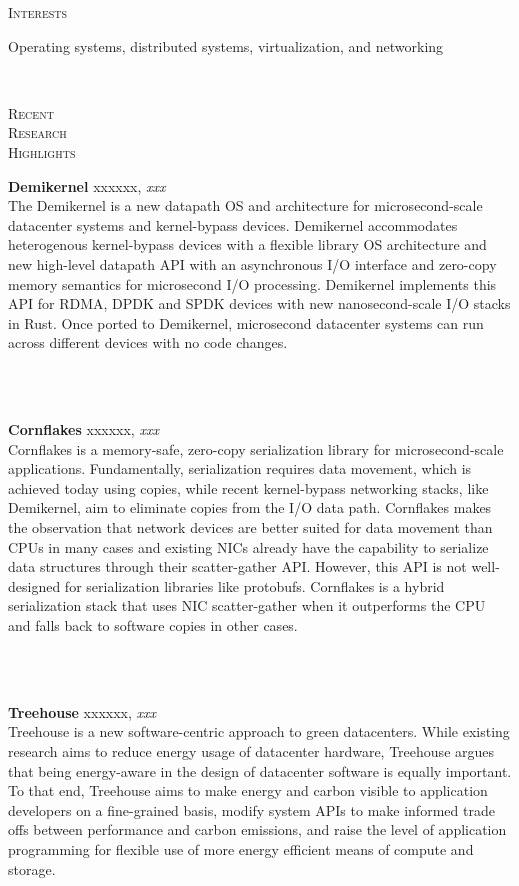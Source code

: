 \documentclass[10pt,times]{report}
\newlength{\sectiongap}
\newlength{\entrygap}
\newlength{\sectioncolwidth}
\newlength{\colgap}
\newlength{\stuffwidth}
\def\ifEqString#1#2{\def\testa{#1}\def\testb{#2}%
  \ifx\testa\testb}
\newenvironment{rtable}{
  \begin{minipage}{\textwidth}
  }{
  \end{minipage}
}
\newenvironment{rentry}[3][xxx]{
  \begin{minipage}[t]{\hsize}
    \textbf{#2}\ifEqString{#1}{xxx}\relax\else, \textit{#1}\fi
    \hspace{\stretch{1}} #3 \\
  }{
    \removelastskip
  \end{minipage}
  \\[\entrygap]  %
}
\newenvironment{rsection}[1]{
  \begin{minipage}[t]{\sectioncolwidth}
    \textsc{#1}
  \end{minipage}
  \hspace{\colgap}
  \begin{minipage}[t]{\stuffwidth}
  }{
    \removelastskip
  \end{minipage}
  \\[\sectiongap]
}
\begin{document}
\begin{rtable}
  \begin{rsection}{Interests}
    Operating systems, distributed systems, virtualization, and networking
  \end{rsection}
  
  \begin{rsection}{Recent\\Research\\Highlights}
    \begin{rentry}{Demikernel}{}
      The Demikernel is a new datapath OS and architecture for
      microsecond-scale datacenter systems and kernel-bypass
      devices. Demikernel accommodates heterogenous kernel-bypass
      devices with a flexible library OS architecture and new
      high-level datapath API with an asynchronous I/O interface and
      zero-copy memory semantics for microsecond I/O
      processing. Demikernel implements this API for RDMA, DPDK and
      SPDK devices with new nanosecond-scale I/O stacks in Rust. Once
      ported to Demikernel, microsecond datacenter systems can run
      across different devices with no code changes.
    \end{rentry}\\
    
    \begin{rentry}{Cornflakes}{}
      Cornflakes is a memory-safe, zero-copy serialization library for
      microsecond-scale applications. Fundamentally, serialization
      requires data movement, which is achieved today using copies,
      while recent kernel-bypass networking stacks, like Demikernel,
      aim to eliminate copies from the I/O data path.  Cornflakes
      makes the observation that network devices are better suited for
      data movement than CPUs in many cases and existing NICs already
      have the capability to serialize data structures through their
      scatter-gather API. However, this API is not well-designed for
      serialization libraries like protobufs. Cornflakes is a hybrid
      serialization stack that uses NIC scatter-gather when it
      outperforms the CPU and falls back to software copies in other
      cases.
    \end{rentry}\\

    \begin{rentry}{Treehouse}{}
      Treehouse is a new software-centric approach to green
      datacenters. While existing research aims to reduce energy usage
      of datacenter hardware, Treehouse argues that being energy-aware in the
      design of datacenter software is equally important. To that end,
      Treehouse aims to make energy and carbon visible to application
      developers on a fine-grained basis, modify system APIs to make
      informed trade offs between performance and carbon emissions,
      and raise the level of application programming for flexible use
      of more energy efficient means of compute and storage.
    \end{rentry}
  \end{rsection}    
\end{rtable}
\end{document}
